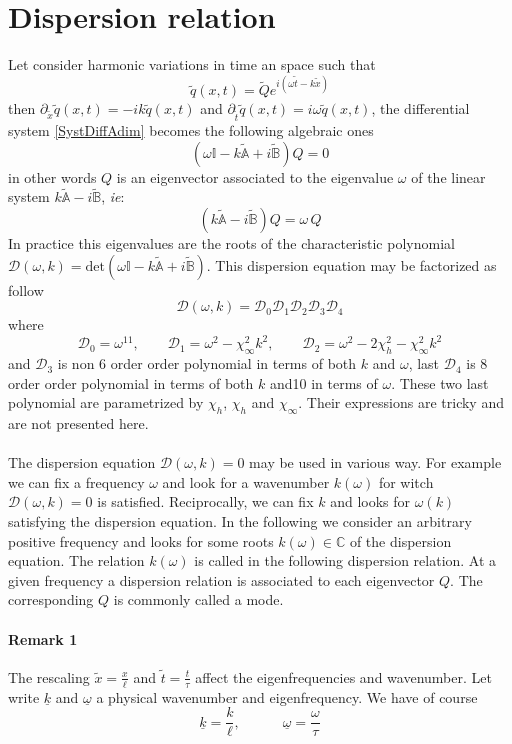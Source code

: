 \documentclass[
10pt, %
a4paper, %
oneside, %
headinclude,footinclude, %
table
]{scrartcl}
\begin{document}
\section{Dispersion relation}
Let consider harmonic variations in time an space such that 
$$
\tilde{q}(x,t)=\tilde{Q}e^{i(\omega \tilde{t}-k\tilde{x})}
$$
then $\partial_{\tilde{x}}\tilde{q}(x,t)=-ik\tilde{q}(x,t)$ and $\partial_{\tilde{t}}\tilde{q}(x,t)=i\omega\tilde{q}(x,t)$, the differential system \ref{SystDiffAdim} becomes the following algebraic ones
\begin{equation}\label{SystDiffAdim}
\left(\omega\mathbb{I} -k\tilde{\mathbb{A}}+i\tilde{\mathbb{B}}\right)Q=0
\end{equation}
in other words $Q$ is an eigenvector associated to the eigenvalue $\omega$ of the linear system $k\tilde{\mathbb{A}}-i\tilde{\mathbb{B}}$, \textit{ie}:
$$
\left(k\tilde{\mathbb{A}}-i\tilde{\mathbb{B}}\right)Q=\omega \, Q
$$
In practice this eigenvalues are the roots of the characteristic polynomial $\mathcal{D}(\omega,k)=\textrm{det}(\omega\mathbb{I} -k\tilde{\mathbb{A}}+i\tilde{\mathbb{B}})$. This dispersion equation may be factorized as follow
$$
\mathcal{D}(\omega,k)=\mathcal{D}_{0}\mathcal{D}_{1}\mathcal{D}_{2}\mathcal{D}_{3}\mathcal{D}_{4}
$$
where 
$$
\mathcal{D}_{0}=\omega^{11}, \quad\quad
\mathcal{D}_{1}=\omega^2-\chi_{\infty}^2k^2, \quad\quad
\mathcal{D}_{2}=\omega^2-2 \chi_{h}^2-\chi_{\infty}^2k^2
$$
and $\mathcal{D}_{3}$ is non 6 order order polynomial in terms of both $k$ and $\omega$, last $\mathcal{D}_{4}$  is 8 order order polynomial in terms of both $k$ and10 in terms of $\omega$. These two last polynomial are parametrized by $\chi_{h}$, $\chi_{h}$ and $\chi_{\infty}$. Their expressions are tricky and are not presented here. \\
\\
The dispersion equation $\mathcal{D}(\omega,k)=0$ may be used in various way. For example we can fix a frequency $\omega$ and look for a wavenumber $k(\omega)$ for witch $\mathcal{D}(\omega,k)=0$ is satisfied. Reciprocally, we can fix $k$ and looks for $\omega(k)$ satisfying the dispersion equation. In the following we consider an arbitrary positive frequency and looks for some roots $k(\omega)\in \mathbb{C}$ of the dispersion equation.  The relation $k(\omega)$ is called in the following dispersion relation. At a given frequency a dispersion relation is associated to each eigenvector $Q$. The corresponding $Q$ is commonly called a mode. \\
\paragraph{\textbf{Remark 1}} The rescaling $\tilde{x}=\frac{x}{\ell}$ and $\tilde{t}=\frac{t}{\tau}$ affect the eigenfrequencies and wavenumber. Let write $\underline{k}$ and $\underline{\omega}$ a physical wavenumber and eigenfrequency.  We have of course 
$$
\underline{k}=\frac{k}{\ell}, \quad\quad\quad
\underline{\omega}=\frac{\omega}{\tau}
$$
\end{document}
